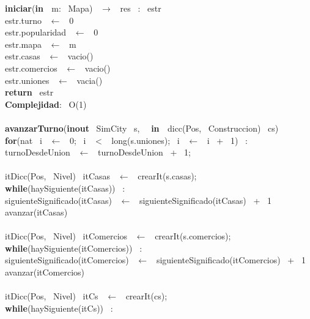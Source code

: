 \noindent \noindent\makebox[\linewidth]{\rule{\textwidth}{0.4pt}}
\textbf{iniciar}(\textbf{in \ }m: \ Mapa) \ $\longrightarrow$ \ res \ : \ estr\\
\indent estr.turno \ $\leftarrow$ \ 0\\
\indent estr.popularidad \ $\leftarrow$ \ 0\\
\indent estr.mapa \ $\leftarrow$ \ m\\
\indent estr.casas \ $\leftarrow$ \ vacio()\\
\indent estr.comercios \ $\leftarrow$ \ vacio()\\
\indent estr.uniones \ $\leftarrow$ \ vacia()\\
\indent \textbf{return} \ estr\\
\textbf{Complejidad}: \ O(1)\\
\noindent\makebox[\linewidth]{\rule{\textwidth}{0.4pt}}
\\
\noindent\makebox[\linewidth]{\rule{\textwidth}{0.4pt}}
\textbf{avanzarTurno}(\textbf{inout} \ SimCity \ s, \  \ \textbf{in \ }dicc(Pos, \ Construccion) \ cs)\\
\indent \textbf{for}(nat \ i \ $\leftarrow$ \ 0; \ i \ $<$ \ long(s.uniones); \ i \ $\leftarrow$ \ i \ + \ 1) \ : \ \\
\indent \indent turnoDesdeUnion \ $\leftarrow$ \ turnoDesdeUnion \ + \ 1;\\
\\
\indent itDicc(Pos, \ Nivel) \ itCasas \ $\leftarrow$ \ crearIt(s.casas);\\
\indent \textbf{while}(haySiguiente(itCasas)) \ :\\
\indent \indent siguienteSignificado(itCasas) \ $\leftarrow$ \ siguienteSignificado(itCasas) \ + \ 1\\
\indent \indent avanzar(itCasas)\\
\\
\indent itDicc(Pos, \ Nivel) \ itComercios \ $\leftarrow$ \ crearIt(s.comercios);\\
\indent \textbf{while}(haySiguiente(itComercios)) \ :\\
\indent \indent siguienteSignificado(itComercios) \ $\leftarrow$ \ siguienteSignificado(itComercios) \ + \ 1\\
\indent \indent avanzar(itComercios)\\
\\
\indent itDicc(Pos, \ Nivel) \ itCs \ $\leftarrow$ \ crearIt(cs);\\
\indent \textbf{while}(haySiguiente(itCs)) \ :\\
